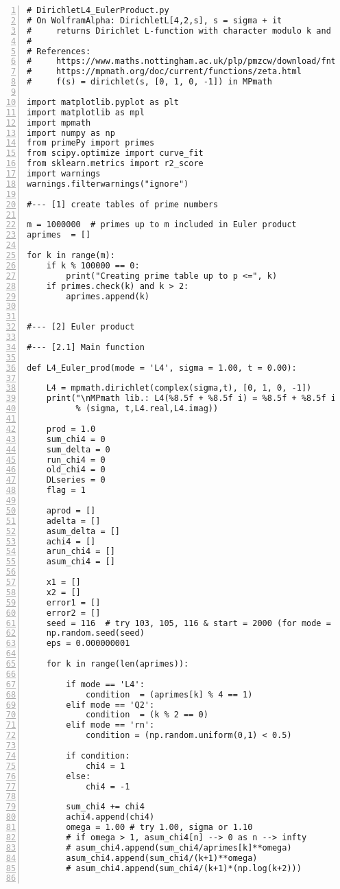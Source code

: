 \documentclass[oneside,10pt]{book}
\begin{document}
\begin{lstlisting}[numbers=left]
# DirichletL4_EulerProduct.py
# On WolframAlpha: DirichletL[4,2,s], s = sigma + it
#     returns Dirichlet L-function with character modulo k and index j.
#
# References:
#     https://www.maths.nottingham.ac.uk/plp/pmzcw/download/fnt_chap4.pdf
#     https://mpmath.org/doc/current/functions/zeta.html
#     f(s) = dirichlet(s, [0, 1, 0, -1]) in MPmath

import matplotlib.pyplot as plt
import matplotlib as mpl
import mpmath
import numpy as np
from primePy import primes
from scipy.optimize import curve_fit
from sklearn.metrics import r2_score
import warnings
warnings.filterwarnings("ignore")

#--- [1] create tables of prime numbers

m = 1000000  # primes up to m included in Euler product
aprimes  = []  

for k in range(m):
    if k % 100000 == 0:
        print("Creating prime table up to p <=", k)
    if primes.check(k) and k > 2:
        aprimes.append(k)


#--- [2] Euler product

#--- [2.1] Main function

def L4_Euler_prod(mode = 'L4', sigma = 1.00, t = 0.00):

    L4 = mpmath.dirichlet(complex(sigma,t), [0, 1, 0, -1]) 
    print("\nMPmath lib.: L4(%8.5f + %8.5f i) = %8.5f + %8.5f i" 
          % (sigma, t,L4.real,L4.imag))

    prod = 1.0
    sum_chi4 = 0 
    sum_delta = 0
    run_chi4 = 0
    old_chi4 = 0
    DLseries = 0
    flag = 1

    aprod = [] 
    adelta = []
    asum_delta = []
    achi4 = []
    arun_chi4 = []
    asum_chi4 = []

    x1 = []
    x2 = []
    error1 = []
    error2 = []
    seed = 116  # try 103, 105, 116 & start = 2000 (for mode = 'rn')
    np.random.seed(seed)
    eps = 0.000000001

    for k in range(len(aprimes)): 
        
        if mode == 'L4':
            condition  = (aprimes[k] % 4 == 1)  
        elif mode == 'Q2':
            condition  = (k % 2 == 0)           
        elif mode == 'rn':
            condition = (np.random.uniform(0,1) < 0.5)
        
        if condition:   
            chi4 = 1
        else:
            chi4 = -1

        sum_chi4 += chi4 
        achi4.append(chi4)
        omega = 1.00 # try 1.00, sigma or 1.10
        # if omega > 1, asum_chi4[n] --> 0 as n --> infty
        # asum_chi4.append(sum_chi4/aprimes[k]**omega)
        asum_chi4.append(sum_chi4/(k+1)**omega) 
        # asum_chi4.append(sum_chi4/(k+1)*(np.log(k+2))) 


\end{lstlisting}
\end{document}
